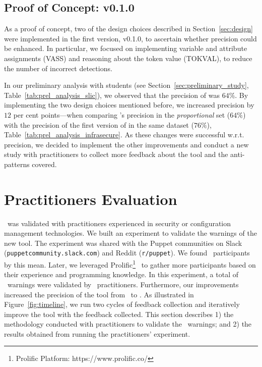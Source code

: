 \subsection{Proof of Concept: \toolname{} v0.1.0}
%
As a proof of concept, two of the design choices described in Section~\ref{sec:design}
were implemented in the first version, \toolname{} v0.1.0, to 
ascertain whether precision could be enhanced. In particular, we focused on implementing 
variable and attribute assignments (VASS) and reasoning about the token value (TOKVAL),  
to reduce the number of incorrect detections. 

In our preliminary analysis with students (see Section~\ref{sec:preliminary_study}, 
Table~\ref{tab:prel_analysis_slic}), we observed that the precision of \slic{} was 
$64\%$. By implementing the two design choices mentioned before, we
increased precision by $12$ per cent points---when comparing \slic{}'s precision in
the \textit{proportional} set ($64\%$) with the precision of the first version of 
\toolname{} in the same dataset ($76\%$), Table~\ref{tab:prel_analysis_infrasecure}.
As these changes were successful w.r.t. precision, we decided to implement 
the other improvements and conduct a new study with practitioners to collect 
more feedback about the tool and the anti-patterns covered.


\section{Practitioners Evaluation}\label{sec:evaluation}

\toolname\ was validated with practitioners experienced in security 
or configuration management technologies. We built an experiment to validate 
the warnings of the new tool. The experiment was shared with the Puppet 
communities on Slack
(\texttt{puppetcommunity.slack.com}) and Reddit (\texttt{r/puppet}).
We found \noProfessionalsCommunity\ participants by this mean. Later, 
we leveraged Prolific\footnote{Prolific Platform: https://www.prolific.co/}~\cite{arxiv.2201.05348} 
to gather more participants
based on their experience and programming knowledge. 
In this experiment, a total of \totalWarningsPrac\ warnings were validated 
by \noProfessionals~practitioners. Furthermore, our improvements increased 
the precision of the tool from \botPrecision\ to \finalPrecision.
As illustrated in Figure~\ref{fig:timeline}, we run
two cycles of feedback collection and iteratively 
improve the tool with the feedback collected.
%
This section describes 1) the methodology 
conducted with practitioners to validate the \toolname\ 
warnings; and 2) the results obtained 
from running the practitioners' experiment.

